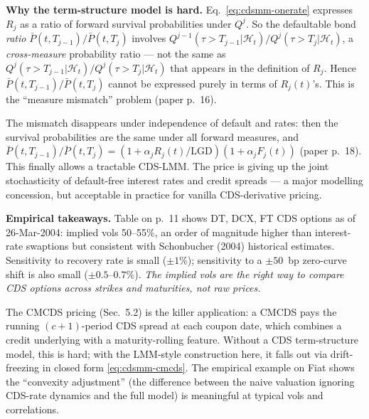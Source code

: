 \documentclass[11pt,a4paper]{article}
\begin{document}
\begin{commentary}
\textbf{Why the term-structure model is hard.} Eq.~\eqref{eq:cdsmm-onerate}
expresses $R_j$ as a ratio of forward survival probabilities under
$Q^j$. So the defaultable bond \emph{ratio} $\bar P(t, T_{j-1})/\bar P(t, T_j)$
involves $Q^{j-1}(\tau > T_{j-1}|\mathcal{H}_t)/Q^j(\tau > T_j|\mathcal{H}_t)$,
a \emph{cross-measure} probability ratio --- not the same as
$Q^j(\tau > T_{j-1}|\mathcal{H}_t)/Q^j(\tau > T_j|\mathcal{H}_t)$ that
appears in the definition of $R_j$. Hence $\bar P(t,T_{j-1})/\bar P(t,T_j)$
cannot be expressed purely in terms of $R_j(t)$'s. This is the
``measure mismatch'' problem (paper p.~16).
\end{commentary}

\begin{commentary}
The mismatch disappears under independence of default and rates:
then the survival probabilities are the same under all forward
measures, and $\bar P(t, T_{j-1})/\bar P(t, T_j) = (1 + \alpha_j R_j(t)/\mathrm{LGD})(1 + \alpha_j F_j(t))$
(paper p.~18). This finally allows a tractable CDS-LMM. The price is
giving up the joint stochasticity of default-free interest rates and
credit spreads --- a major modelling concession, but acceptable in
practice for vanilla CDS-derivative pricing.
\end{commentary}

\begin{commentary}
\textbf{Empirical takeaways.} Table on p.~11 shows DT, DCX, FT CDS
options as of 26-Mar-2004: implied vols 50--55\%, an order of
magnitude higher than interest-rate swaptions but consistent with
Schonbucher (2004) historical estimates. Sensitivity to recovery
rate is small ($\pm 1$\%); sensitivity to a $\pm 50$~bp zero-curve
shift is also small ($\pm 0.5$--$0.7\%$). \emph{The implied vols are
the right way to compare CDS options across strikes and maturities,
not raw prices.}
\end{commentary}

\begin{commentary}
The CMCDS pricing (Sec.~5.2) is the killer application: a CMCDS pays
the running $(c+1)$-period CDS spread at each coupon date, which
combines a credit underlying with a maturity-rolling feature.
Without a CDS term-structure model, this is hard; with the LMM-style
construction here, it falls out via drift-freezing in closed form
\eqref{eq:cdsmm-cmcds}. The empirical example on Fiat shows the
``convexity adjustment'' (the difference between the naive valuation
ignoring CDS-rate dynamics and the full model) is meaningful at
typical vols and correlations.
\end{commentary}
\end{document}
